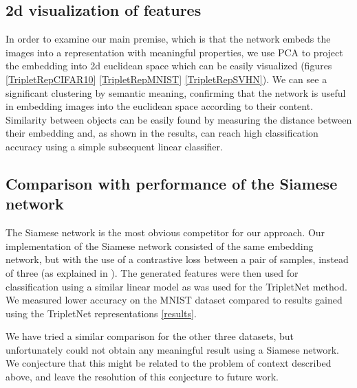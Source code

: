 \documentclass{article} %
\begin{document}
\subsection{2d visualization of features}
In order to examine our main premise, which is that the network embeds the images into a representation with meaningful properties, we
use PCA to project the embedding into 2d euclidean space which can be easily visualized (figures \ref{TripletRepCIFAR10} \ref{TripletRepMNIST} \ref{TripletRepSVHN}).
We can see a significant clustering by semantic meaning, confirming that the network is useful in embedding
images into the euclidean space according to their content. 
 Similarity between objects can be easily found by  measuring the distance between their embedding and, as shown in the results, can reach high
classification accuracy using a simple subsequent linear classifier. 

\subsection{Comparison with performance of the Siamese network}
The Siamese network is the most obvious competitor for our approach.  Our implementation of the Siamese network consisted of the same embedding network, but with the use of a contrastive loss between a pair of samples, instead of three (as explained in  \cite{Chopra2005}).  The generated features were then used for classification using a similar linear model as was used for the TripletNet method. We measured lower accuracy on the MNIST dataset compared to results gained using the TripletNet representations \ref{results}. 

We have tried a similar comparison for the other three datasets, but unfortunately could not obtain any meaningful result using a Siamese network.
We conjecture that this might be related to the problem of context described above, and leave the resolution of this 
conjecture to future work.
\end{document}

